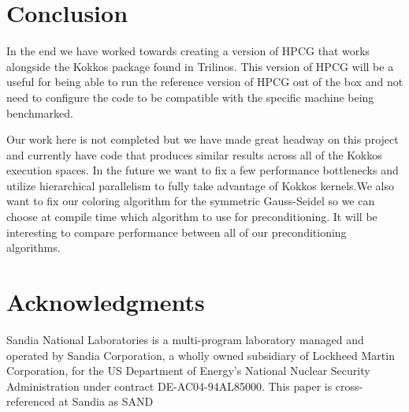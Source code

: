 \documentclass{ccr15}
\begin{document}
\lstset{language=[ISO]C++}


\lstset{language=[ISO]C++}


\section{Conclusion}
In the end we have worked towards creating a version of HPCG that works alongside the Kokkos
package found in Trilinos. This version of HPCG will be a useful for being able to run the reference
version of HPCG out of the box and not need to configure the code to be compatible with the
specific machine being benchmarked.

Our work here is not completed but we have made great headway on this project and currently have
code that produces similar results across all of the Kokkos execution spaces. In the future we want to
fix a few performance bottlenecks and utilize hierarchical parallelism to fully take advantage of Kokkos
kernels.We also want to fix our coloring algorithm for the symmetric Gauss-Seidel so we can choose at
compile time which algorithm to use for preconditioning. It will be interesting to compare performance
between all of our preconditioning algorithms.
\section{Acknowledgments}
Sandia National Laboratories is a multi-program laboratory managed and operated by Sandia Corporation, a wholly owned subsidiary of Lockheed Martin Corporation, for the US Department of Energy{'}s National Nuclear Security Administration under contract DE-AC04-94AL85000. This paper is cross-referenced at Sandia as SAND


\nocite{ZAB:TechHPCG}
\nocite{ZAB:TechHPCG2}
\nocite{ZAB:Kokkos}
\nocite{ZAB:Trilinos}
\nocite{ZAB:Top500}
\nocite{ZAB:CUDA}
\nocite{ZAB:OpenMP}
\nocite{ZAB:PThreads}

%
\end{document}
